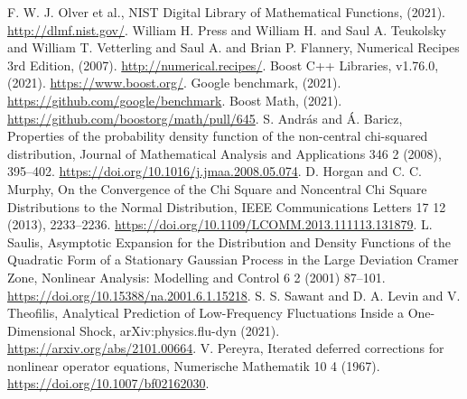 \documentclass{amsart}
\numberwithin{equation}{section}
\begin{document}
\begin{thebibliography}{99}
 F. W. J. Olver et al., NIST Digital Library of Mathematical Functions, (2021). \url{http://dlmf.nist.gov/}.
 William H. Press and William H.  and Saul A. Teukolsky and William T. Vetterling and Saul A. and Brian P. Flannery, Numerical Recipes 3rd Edition, (2007). \url{http://numerical.recipes/}.
 Boost C++ Libraries, v1.76.0, (2021). \url{https://www.boost.org/}.
 Google benchmark, (2021). \url{https://github.com/google/benchmark}.
 Boost Math, (2021). \url{https://github.com/boostorg/math/pull/645}.
 S. Andr{\'{a}}s and {\'{A}}. Baricz, Properties of the probability density function of the non-central chi-squared distribution, Journal of Mathematical Analysis and Applications 346 2 (2008), 395--402. \url{https://doi.org/10.1016/j.jmaa.2008.05.074}.
 D. Horgan and C. C. Murphy, On the Convergence of the Chi Square and Noncentral Chi Square Distributions to the Normal Distribution, IEEE Communications Letters 17 12 (2013), 2233--2236. \url{https://doi.org/10.1109/LCOMM.2013.111113.131879}.
 L. Saulis, Asymptotic Expansion for the Distribution and Density Functions of the Quadratic Form of a Stationary Gaussian Process in the Large Deviation Cramer Zone, Nonlinear Analysis: Modelling and Control 6 2 (2001) 87--101. \url{https://doi.org/10.15388/na.2001.6.1.15218}.
 S. S. Sawant and D. A. Levin and V. Theofilis, Analytical Prediction of Low-Frequency Fluctuations Inside a One-Dimensional Shock, arXiv:physics.flu-dyn (2021). \url{https://arxiv.org/abs/2101.00664}.
 V. Pereyra, Iterated deferred corrections for nonlinear operator equations, Numerische Mathematik 10 4 (1967). \url{https://doi.org/10.1007/bf02162030}.
\end{thebibliography}
\end{document}

